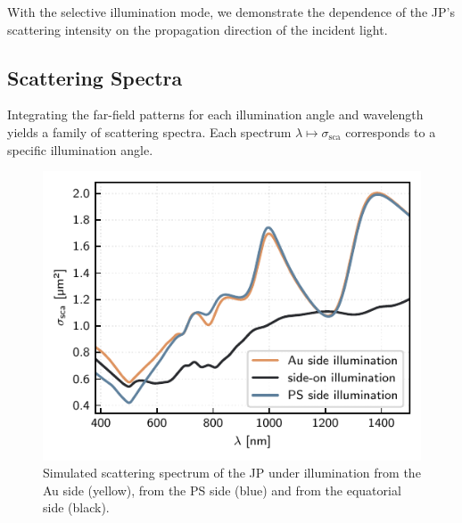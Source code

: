 \documentclass[10pt]{article}
\begin{document}

With the selective illumination mode, we demonstrate the dependence of the JP's scattering intensity on the propagation direction of the incident light. 



\subsection*{Scattering Spectra}

Integrating the far-field patterns for each illumination angle and wavelength yields a family of scattering spectra. 
Each spectrum $\lambda\mapsto\sigma_\mathrm{sca}$ corresponds to a specific illumination angle. 

\begin{figure}[h]
    \centering
    \includegraphics{[fig] spectra (principal).PDF}
    \caption{Simulated scattering spectrum of the JP under illumination from the Au side (yellow), from the PS side (blue) and from the equatorial side (black).}
    \label{fig:spectra-principal}
\end{figure}
\end{document}
